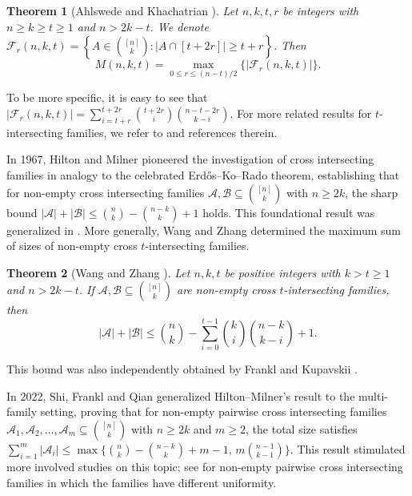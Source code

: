 \documentclass[11pt,a4paper]{article}
\newtheorem{theorem}{Theorem}[section]
\begin{document}
\begin{theorem}[Ahlswede and Khachatrian \cite{AK1997,AK1999}] \label{AK1997}
Let $n, k, t, r$ be integers with $n \geq  k \geq  t\geq  1$ and $n>2k-t$. We denote $\mathcal{F}_r(n,k,t)  =\left\{A \in \binom{[n]}{k}:|A\cap[t+2r]| \geq  t+r\right\}$. Then
\begin{equation*} \label{eq-AK}
M(n,k, t)= \max_{0\leq r\leq {(n-t)}/{2} }\{| \mathcal{F}_r(n,k,t)|\}. 
\end{equation*} 
\end{theorem}

To be more specific, it is easy to see that 
$|\mathcal{F}_r(n,k,t)| = \sum_{i=t+r}^{t+2r} {t+2r \choose i} {n-t-2r \choose k-i}$. 
For more related results for $t$-intersecting families, 
we refer to \cite{AK1996,BM2008, CLW2021, CLLW2022,ZW2025,FW2025} and references therein. 

In 1967, Hilton and Milner \cite{H67} pioneered the investigation of cross intersecting families in analogy to the celebrated Erd\H{o}s--Ko--Rado theorem, establishing that for non-empty cross intersecting families $\mathcal{A}, \mathcal{B} \subseteq \binom{[n]}{k}$ with $n \geq  2k$, the sharp bound $|\mathcal{A}| + |\mathcal{B}| \leq \binom{n}{k} - \binom{n-k}{k} + 1$ holds. This foundational result was generalized in \cite{F92,FT1998,Fra2024,FW2024-EUJC}. 
More generally, 
Wang and Zhang \cite{W13} determined the maximum sum of sizes of non-empty cross $t$-intersecting families. 

\begin{theorem}[Wang and Zhang \cite{W13}]
Let $n,k,t$ be positive integers with $k> t\geq  1$ and $n> 2k-t$. 
If $\mathcal{A}, \mathcal{B} \subseteq {[n] \choose k}$ 
 are non-empty cross $t$-intersecting families, then 
 \begin{equation*}
     \label{eq-WZ}
      |\mathcal{A}| + |\mathcal{B}| \leq {n \choose k} 
 - \sum_{i=0}^{t-1} {k \choose i} {n-k \choose k-i} +1. 
 \end{equation*}
 \end{theorem}
 This bound was also independently obtained by Frankl and Kupavskii \cite{F17}. 
 

 In 2022, 
 Shi, Frankl and Qian \cite{S22} generalized  Hilton--Milner's result to the multi-family setting, proving that for non-empty pairwise cross intersecting families $\mathcal{A}_1, \mathcal{A}_2, \ldots, \mathcal{A}_m \subseteq \binom{[n]}{k}$ with $n \geq  2k$ and $m \geq  2$, the total size satisfies $\sum_{i=1}^m |\mathcal{A}_i| \leq \max \big\{ \binom{n}{k} - \binom{n-k}{k} + m - 1, \, m \binom{n-1}{k-1} \big\}$. 
 This result stimulated more involved studies on this topic; see  \cite{HY-first,H25,Huang2025,ZF2024} for non-empty pairwise cross intersecting families in which the families have different uniformity. 
\end{document}
